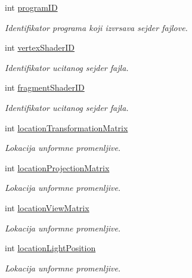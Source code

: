 \begin{DoxyCompactItemize}
\item 
int \hyperlink{classshader_1_1TerrainShader_a1cb59b7dac7526e5aa17f6861f8874a6}{program\+ID}
\begin{DoxyCompactList}\small\item\em Identifikator programa koji izvrsava sejder fajlove. \end{DoxyCompactList}\item 
int \hyperlink{classshader_1_1TerrainShader_a5f65bb56d6c39b58e79488d2d4409396}{vertex\+Shader\+ID}
\begin{DoxyCompactList}\small\item\em Identifikator ucitanog sejder fajla. \end{DoxyCompactList}\item 
int \hyperlink{classshader_1_1TerrainShader_a0656e567bdee6c000d3fafdc77e653be}{fragment\+Shader\+ID}
\begin{DoxyCompactList}\small\item\em Identifikator ucitanog sejder fajla. \end{DoxyCompactList}\item 
int \hyperlink{classshader_1_1TerrainShader_a1cc3dc2a1aa0190449aa65c5c97911f3}{location\+Transformation\+Matrix}
\begin{DoxyCompactList}\small\item\em Lokacija unformne promenljive. \end{DoxyCompactList}\item 
int \hyperlink{classshader_1_1TerrainShader_af3f85d8f7301ce71b37fb99fbad6cc22}{location\+Projection\+Matrix}
\begin{DoxyCompactList}\small\item\em Lokacija unformne promenljive. \end{DoxyCompactList}\item 
int \hyperlink{classshader_1_1TerrainShader_a3af96cb61a1d54646951c1cc46d161b5}{location\+View\+Matrix}
\begin{DoxyCompactList}\small\item\em Lokacija unformne promenljive. \end{DoxyCompactList}\item 
int \hyperlink{classshader_1_1TerrainShader_a04ee26df93502b6beec604260143f749}{location\+Light\+Position}
\begin{DoxyCompactList}\small\item\em Lokacija unformne promenljive. \end{DoxyCompactList}\item 

\end{DoxyCompactItemize}
